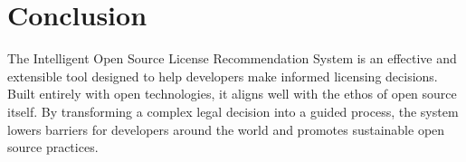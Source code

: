 \documentclass[12pt,a4paper]{report}
\begin{document}
\chapter{Conclusion}
The Intelligent Open Source License Recommendation System is an effective and extensible tool designed to help developers make informed licensing decisions. Built entirely with open technologies, it aligns well with the ethos of open source itself. By transforming a complex legal decision into a guided process, the system lowers barriers for developers around the world and promotes sustainable open source practices.
\end{document}
